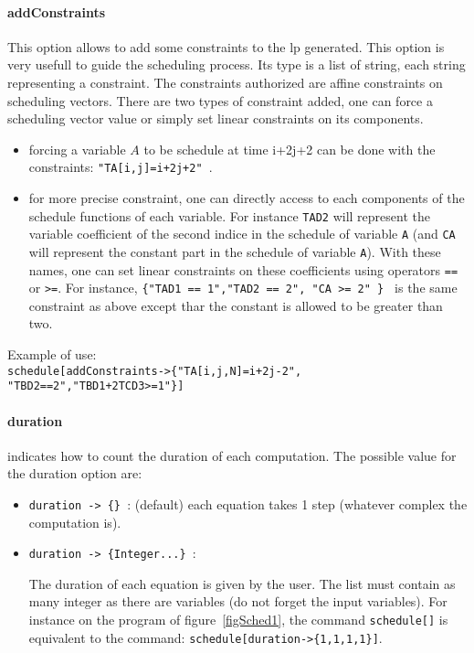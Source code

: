 \paragraph{addConstraints}
This option allows to add some constraints to the {\sc lp} generated.
This option is very usefull to guide the scheduling process.
 Its type is a list of string, each string representing a constraint. The
 constraints authorized are affine constraints on scheduling
vectors.
There are two types of  constraint added, one can force a scheduling
vector value or simply set linear constraints on its components. 
\begin{itemize}
\item forcing a  variable $A$ to be schedule at time i+2j+2 can be done 
with the constraints: \texttt{"TA[i,j]=i+2j+2" }. 
\item for more precise constraint,  one can directly access to each components 
of the schedule functions of each variable. For instance \texttt{TAD2}
 will represent the variable coefficient of the second indice
 in the schedule of variable \texttt{A} (and \texttt{CA} will represent 
the constant part in the schedule of variable \texttt{A}).
 With these names, one can set linear constraints 
on these coefficients using operators \texttt{==} or \texttt{>=}. For instance,
\texttt{\{"TAD1 == 1","TAD2 == 2", "CA >= 2" \} } is the same constraint
as above except thar the constant is allowed to be greater than two.
\end{itemize}  
Example of use:\\
\texttt{schedule[addConstraints->\{"TA[i,j,N]=i+2j-2",
"TBD2==2","TBD1+2TCD3>=1"\}]}



\paragraph{duration} indicates how to count the duration of each computation. The possible value for the duration option are: 
\begin{itemize}
\item \texttt{duration -> \{\} }: (default) each equation takes 1 step
	 (whatever complex the computation is).
\item \texttt{duration -> \{Integer...\} }: 

The duration of each equation is given by the user. The list must
contain as many integer as there are variables (do not forget the
input variables). For instance on the program of figure~\ref{figSched1}, the
command \texttt{schedule[]} is equivalent to the command:
\texttt{schedule[duration->\{1,1,1,1\}]}.
\end{itemize}


